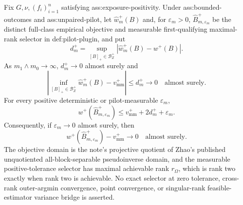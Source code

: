 Fix \(G,\nu,(f_i)_{i=1}^n\) satisfying ass:exposure-positivity.  Under ass:bounded-outcomes and ass:unpaired-pilot, let \(\widehat w_m^+(B)\) and, for \(\varepsilon_m>0\), \(\widehat B_{m,\varepsilon_m}^+\) be the distinct full-class empirical objective and measurable first-qualifying maximal-rank selector in def:pilot-plugin, and put
\[
d_m^+=\sup_{[B]_+\in\mathcal B_Z^+}|\widehat w_m^+(B)-w^+(B)|.
\]
As \(m_1\wedge m_0\to\infty\), \(d_m^+\to0\) almost surely and
\[
\left|\inf_{[B]_+\in\mathcal B_Z^+}\widehat w_m^+(B)-v_{\mathrm{mm}}^+\right|
\le d_m^+\longrightarrow0
\quad\text{almost surely}.
\]
For every positive deterministic or pilot-measurable \(\varepsilon_m\),
\[
w^+(\widehat B_{m,\varepsilon_m}^+)
\le v_{\mathrm{mm}}^++2d_m^++\varepsilon_m.
\]
Consequently, if \(\varepsilon_m\to0\) almost surely, then
\[
w^+(\widehat B_{m,\varepsilon_m}^+)-v_{\mathrm{mm}}^+\longrightarrow0
\quad\text{almost surely}.
\]
The objective domain is the note's projective quotient of Zhao's published unquotiented all-block-separable pseudoinverse domain, and the measurable positive-tolerance selector has maximal achievable rank \(r_\Omega\), which is rank two exactly when rank two is achievable.  No exact selector at zero tolerance, cross-rank outer-argmin convergence, point convergence, or singular-rank feasible-estimator variance bridge is asserted.